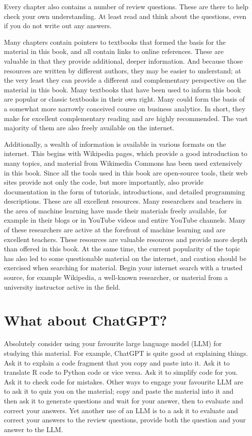 Every chapter also contains a number of review questions. These are there to help check your own understanding. At least read and think about the questions, even if you do not write out any answers. 

Many chapters contain pointers to textbooks that formed the basis for the material in this book, and all contain links to online references. These are valuable in that they provide additional, deeper information. And because those resources are written by different authors, they may be easier to understand; at the very least they can provide a different and complementary perspective on the material in this book. Many textbooks that have been used to inform this book are popular or classic textbooks in their own right. Many could form the basis of a somewhat more narrowly conceived course on business analytics. In short, they make for excellent complementary reading and are highly recommended. The vast majority of them are also freely available on the internet.

Additionally, a wealth of information is available in various formats on the internet. This begins with Wikipedia pages, which provide a good introduction to many topics, and material from Wikimedia Commons has been used extensively in this book. Since all the tools used in this book are open-source tools, their web sites provide not only the code, but more importantly, also provide documentation in the form of tutorials, introductions, and detailed programming descriptions. These are all excellent resources. Many researchers and teachers in the area of machine learning have made their materials freely available, for example in their blogs or in YouTube videos and entire YouTube channels. Many of these researchers are active at the forefront of machine learning and are excellent teachers. These resources are valuable resources and provide more depth than offered in this book. At the same time, the current popularity of the topic has also led to some questionable material on the internet, and caution should be exercised when searching for material. Begin your internet search with a trusted source, for example Wikipedia, a well-known researcher, or material from a university instructor active in the field. 

\section*{What about ChatGPT?}

Absolutely consider using your favourite large language model (LLM) for studying this material. For example, ChatGPT is quite good at explaining things. Ask it to explain a code fragment that you copy and paste into it. Ask it to translate R code to Python code or vice versa. Ask it to simplify code for you. Ask it to check code for mistakes. Other ways to engage your favourite LLM are to ask it to quiz you on the material; copy and paste the material into it and then ask it to generate questions and wait for your answer, then to evaluate and correct your answers. Yet another use of an LLM is to a ask it to evaluate and correct your answers to the review questions, provide both the question and your answer to the LLM.
 
